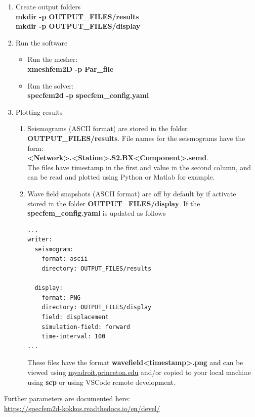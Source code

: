 \documentclass[11pt,titlepage,fleqn]{article}
\begin{document}
\begin{enumerate}
\item Create output folders\\
      {\bf mkdir -p OUTPUT\_FILES/results}\\
      {\bf mkdir -p OUTPUT\_FILES/display}
      
\item Run the software
  \begin{itemize}
    \item Run the mesher:\\
          {\bf xmeshfem2D -p Par\_file}
    \item Run the solver:\\
          {\bf specfem2d -p specfem\_config.yaml}
  \end{itemize}

\item  Plotting results
  \begin{enumerate}
    \item Seismograms (ASCII format) are stored in the folder {\bf OUTPUT\_FILES/results}. File names for the seismograms have the form: \\
        {\bf  <Network>.<Station>.S2.BX<Component>.semd}. \\
        The files have timestamp in the first and value in the second column, and can be read and plotted using Python or Matlab for example.

    \item Wave field snapshots (ASCII format) are off by default by if activate stored in the folder {\bf OUTPUT\_FILES/display}. If the {\bf specfem\_config.yaml} is updated as follows
\begin{lstlisting}
...
writer:
  seismogram:
    format: ascii
    directory: OUTPUT_FILES/results

  display:
    format: PNG
    directory: OUTPUT_FILES/display
    field: displacement
    simulation-field: forward
    time-interval: 100
...
\end{lstlisting}
         These files have the format {\bf wavefield<timestamp>.png} and can be viewed using \url{myadroit.princeton.edu} and/or copied to your local machine using {\bf scp} or using VSCode remote development.
   
  \end{enumerate}

\end{enumerate}

\noindent Further parameters are documented here:\\
\phantom{ } \url{https://specfem2d-kokkos.readthedocs.io/en/devel/}
\end{document}
